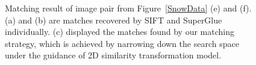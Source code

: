 \begin{figure}[htbp]
\begin{center}
{\begin{minipage}[t]{1\linewidth}
			\end{minipage}%
		}
		\caption{Matching result of image pair from Figure~\ref{SnowData} (e) and (f). (a) and (b) are matches recovered by SIFT and SuperGlue individually. (c) displayed the matches found by our matching strategy, which is achieved by narrowing down the search space under the guidance of 2D similarity transformation model.}
		\label{Matchresult}
	\end{center}
\end{figure} 

